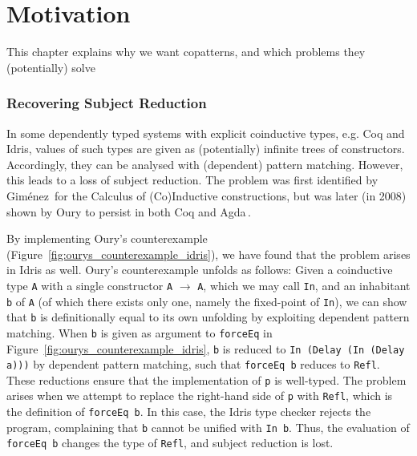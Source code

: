 
\chapter{Motivation}
This chapter explains why we want copatterns, and which problems they
(potentially) solve

\subsection{Recovering Subject Reduction}
\label{sec:recov-subj-reduct}

In some dependently typed systems with explicit coinductive types, e.g. Coq and
Idris, values of such types are given as (potentially) infinite trees of
constructors. Accordingly, they can be analysed with (dependent) pattern
matching. However, this leads to a loss of subject reduction. The problem was
first identified by Gim\'{e}nez\,\citep{Gimenez96uncalcul} for the Calculus of
(Co)Inductive constructions, but was later (in 2008) shown by Oury to persist in
both Coq and Agda\,\citep{OuryCounterexampleCoq,OuryCounterexampleAgda}.

By implementing Oury's counterexample
(Figure~\ref{fig:ourys_counterexample_idris}), we have found that the problem
arises in Idris as well. Oury's counterexample unfolds as follows: Given a
coinductive type \texttt{A} with a single constructor \texttt{A} $\to$ \texttt{A}, which we may call
\texttt{In}, and an inhabitant \texttt{b} of \texttt{A} (of which there exists only one,
namely the fixed-point of \texttt{In}), we can show that \texttt{b} is definitionally
equal to its own unfolding by exploiting dependent pattern matching. When
\texttt{b} is given as argument to \texttt{forceEq} in
Figure~\ref{fig:ourys_counterexample_idris}, \texttt{b} is reduced to \texttt{In
  (Delay (In (Delay a)))} by dependent pattern matching, such that \texttt{forceEq b}
reduces to \texttt{Refl}. These reductions ensure that the implementation of
\texttt{p} is well-typed. The problem arises when we attempt to replace the
right-hand side of \texttt{p} with \texttt{Refl}, which is the definition of
\texttt{forceEq b}. In this case, the Idris type checker rejects the program,
complaining that \texttt{b} cannot be unified with \texttt{In b}. Thus, the
evaluation of \texttt{forceEq b} changes the type of \texttt{Refl}, and subject
reduction is lost.

